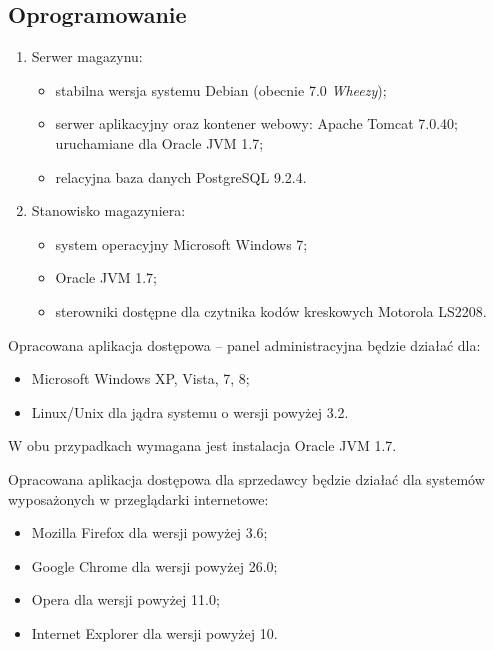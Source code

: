 \subsection{Oprogramowanie}

\begin{enumerate}
\item Serwer magazynu:
  \begin{itemize}
  \item stabilna wersja systemu Debian (obecnie 7.0 \emph{Wheezy});
  \item serwer aplikacyjny oraz kontener webowy: Apache Tomcat 7.0.40; uruchamiane dla Oracle JVM 1.7;
  \item relacyjna baza danych PostgreSQL 9.2.4.
  \end{itemize}
\item Stanowisko magazyniera:
  \begin{itemize}
  \item system operacyjny Microsoft Windows 7;
  \item Oracle JVM 1.7;
  \item sterowniki dostępne dla czytnika kodów kreskowych Motorola LS2208.
  \end{itemize}
\end{enumerate}

Opracowana aplikacja dostępowa -- panel administracyjna będzie działać dla:
\begin{itemize}
\item Microsoft Windows XP, Vista, 7, 8;
\item Linux/Unix dla jądra systemu o wersji powyżej 3.2.
\end{itemize}
W obu przypadkach wymagana jest instalacja Oracle JVM 1.7.

Opracowana aplikacja dostępowa dla sprzedawcy będzie działać dla systemów
wyposażonych w przeglądarki internetowe:
\begin{itemize}
\item Mozilla Firefox dla wersji powyżej 3.6;
\item Google Chrome dla wersji powyżej 26.0;
\item Opera dla wersji powyżej 11.0;
\item Internet Explorer dla wersji powyżej 10.
\end{itemize}


